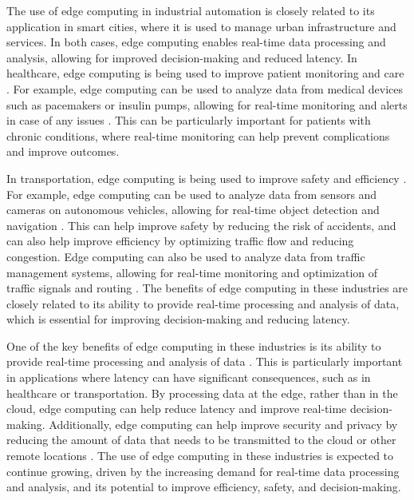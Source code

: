 \documentclass[11pt]{article}
\begin{document}
The use of edge computing in industrial automation is closely related to its application in smart cities, where it is used to manage urban infrastructure and services. In both cases, edge computing enables real-time data processing and analysis, allowing for improved decision-making and reduced latency. In healthcare, edge computing is being used to improve patient monitoring and care \cite{ref39}. For example, edge computing can be used to analyze data from medical devices such as pacemakers or insulin pumps, allowing for real-time monitoring and alerts in case of any issues \cite{ref40}. This can be particularly important for patients with chronic conditions, where real-time monitoring can help prevent complications and improve outcomes.

In transportation, edge computing is being used to improve safety and efficiency \cite{ref41}. For example, edge computing can be used to analyze data from sensors and cameras on autonomous vehicles, allowing for real-time object detection and navigation \cite{ref42}. This can help improve safety by reducing the risk of accidents, and can also help improve efficiency by optimizing traffic flow and reducing congestion. Edge computing can also be used to analyze data from traffic management systems, allowing for real-time monitoring and optimization of traffic signals and routing \cite{ref43}. The benefits of edge computing in these industries are closely related to its ability to provide real-time processing and analysis of data, which is essential for improving decision-making and reducing latency.

One of the key benefits of edge computing in these industries is its ability to provide real-time processing and analysis of data \cite{ref44}. This is particularly important in applications where latency can have significant consequences, such as in healthcare or transportation. By processing data at the edge, rather than in the cloud, edge computing can help reduce latency and improve real-time decision-making. Additionally, edge computing can help improve security and privacy by reducing the amount of data that needs to be transmitted to the cloud or other remote locations \cite{ref45}. The use of edge computing in these industries is expected to continue growing, driven by the increasing demand for real-time data processing and analysis, and its potential to improve efficiency, safety, and decision-making.
\end{document}
